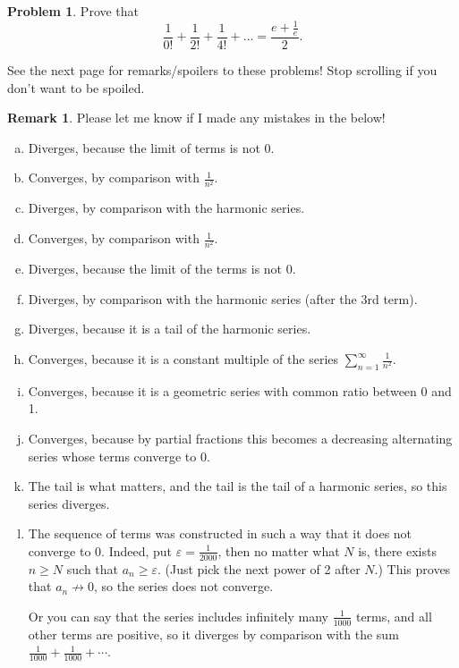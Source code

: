 \documentclass[11pt,oneside]{amsart}
\theoremstyle{definition}
\newtheorem{problem}{Problem}
\newtheorem{remark}{Remark}
\newcommand{\eps}{\varepsilon}
\begin{document}
\begin{problem}
Prove that
\[\frac 1{0!}+\frac 1{2!}+\frac 1{4!}+\dots=\frac{e+\frac 1e}2.\]
\end{problem}

\bigskip
See the next page for remarks/spoilers to these problems! Stop scrolling if you don't want to be spoiled.

\newpage

\begin{remark}
  Please let me know if I made any mistakes in the below!
  \begin{enumerate}[(a)]
    \item Diverges, because the limit of terms is not 0.
    \item Converges, by comparison with $\frac 1{n^2}$.
    \item Diverges, by comparison with the harmonic series.
    \item Converges, by comparison with $\frac 1{n^2}$.
    \item Diverges, because the limit of the terms is not 0.
    \item Diverges, by comparison with the harmonic series (after the 3rd term).
    \item Diverges, because it is a tail of the harmonic series.
    \item Converges, because it is a constant multiple of the series $\sum_{n=1}^\infty \frac 1{n^2}$.
    \item Converges, because it is a geometric series with common ratio between 0 and 1.
    \item Converges, because by partial fractions this becomes a decreasing alternating series whose terms converge to 0.
    \item The tail is what matters, and the tail is the tail of a harmonic series, so this series diverges.
    \item The sequence of terms was constructed in such a way that it does not converge to 0. Indeed, put $\eps=\frac 1{2000}$, then no matter what $N$ is, there exists $n\geq N$ such that $a_n\geq\eps$. (Just pick the next power of 2 after $N$.) This proves that $a_n\not\to 0$, so the series does not converge.
    
    Or you can say that the series includes infinitely many $\frac 1{1000}$ terms, and all other terms are positive, so it diverges by comparison with the sum $\frac 1{1000}+\frac 1{1000}+\cdots$.
  \end{enumerate}
\end{remark}
\end{document}
